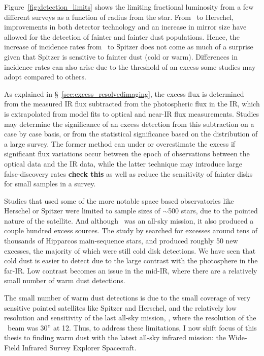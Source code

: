    
   Figure~\ref{fig:detection_limits} shows the limiting fractional luminosity from a few different surveys as a function of radius from the star. From \iras\ to Herschel, improvements in both detector technology and an increase in mirror size have allowed for the detection of fainter and fainter dust populations. Hence, the increase of incidence rates from \iras\ to Spitzer does not come as much of a surprise given that Spitzer is sensitive to fainter dust (cold or warm). Differences in incidence rates can also arise due to the threshold of an excess some studies may adopt compared to others. 
   
   As explained in \S~\ref{sec:excess_resolvedimaging}, the excess flux is determined from the measured IR flux subtracted from the photospheric flux in the IR, which is extrapolated from model fits to optical and near-IR flux measurements. Studies may determine the significance of an excess detection from this subtraction on a case by case basis, or from the statistical significance based on the distribution of a large survey. The former method can under or overestimate the excess if significant flux variations occur between the epoch of observations between the optical data and the IR data, while the latter technique may introduce large false-discovery rates \textbf{check this} as well as reduce the sensitivity of fainter disks for small samples in a survey. 
   
   Studies that used some of the more notable space based observatories like Herschel or Spitzer were limited to sample sizes of $\sim$500 stars, due to the pointed nature of the satellite. And although \iras\ was an all-sky mission, it also produced a couple hundred excess sources. The study by \citet{Rhee2007} searched for excesses around tens of thousands of Hipparcos main-sequence stars, and produced roughly 50 new excesses, the majority of which were still cold disk detections. We have seen that cold dust is easier to detect due to the large contrast with the photosphere in the far-IR. Low contrast becomes an issue in the mid-IR, where there are a relatively small number of warm dust detections.
   
   The small number of warm dust detections is due to the small coverage of very sensitive pointed satellites like Spitzer and Herschel, and the relatively low resolution and sensitivity of the last all-sky mission, \iras, where the resolution of the \iras\ beam was 30'' at 12\micron. Thus, to address these limitations, I now shift focus of this thesis to finding warm dust with the latest all-sky infrared mission: the Wide-Field Infrared Survey Explorer Spacecraft.
   
